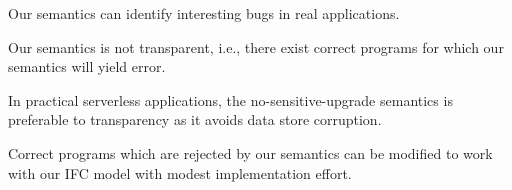 \begin{conj}
Our semantics can identify interesting bugs in real applications.
\end{conj}

\begin{conj}
Our semantics is not transparent, i.e., there exist correct programs for which our semantics
will yield error.
\end{conj}

\begin{conj}
In practical serverless applications, the no-sensitive-upgrade semantics is preferable to transparency
as it avoids data store corruption.
\end{conj}

\begin{conj}
Correct programs which are rejected by our semantics can be modified to work with our IFC model with modest implementation effort.
\end{conj}

